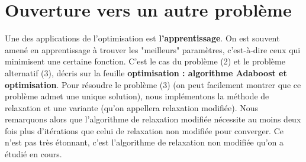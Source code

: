 \documentclass[9pt,a4paper]{article}
\begin{document}
\section{Ouverture vers un autre problème}
Une des applications de l'optimisation est \textbf{l'apprentissage}. On est souvent amené en apprentissage à trouver les "meilleurs" paramètres, c'est-à-dire ceux qui minimisent une certaine fonction. C'est le cas du problème (2) et le problème alternatif (3), décris sur la feuille \textbf{optimisation : algorithme Adaboost et optimisation}.\newline
Pour résoudre le problème (3) (on peut facilement montrer que ce problème admet une unique solution), nous implémentons la méthode de relaxation et une variante (qu'on appellera relaxation modifiée). Nous remarquons alors que l'algorithme de relaxation modifiée nécessite au moins deux fois plus d'itérations que celui de relaxation non modifiée pour converger. Ce n'est pas très étonnant, c'est l'algorithme de relaxation non modifiée qu'on a étudié en cours.\newline
\end{document}
